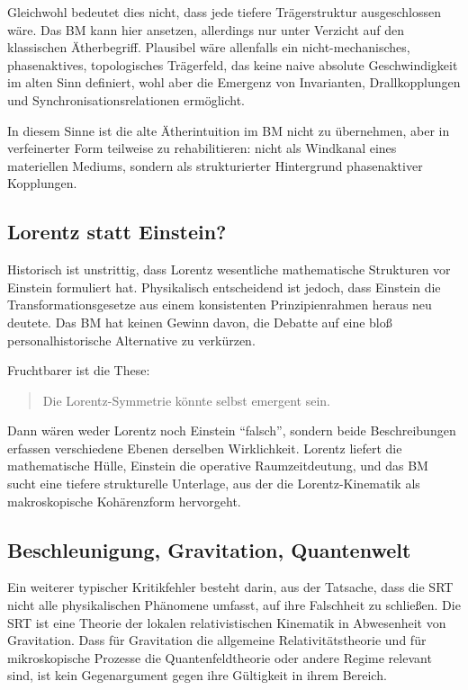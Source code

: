 \documentclass[12pt,a4paper]{article}
\begin{document}
	Gleichwohl bedeutet dies nicht, dass jede tiefere Trägerstruktur ausgeschlossen wäre. Das BM kann hier ansetzen, allerdings nur unter Verzicht auf den klassischen Ätherbegriff. Plausibel wäre allenfalls ein nicht-mechanisches, phasenaktives, topologisches Trägerfeld, das keine naive absolute Geschwindigkeit im alten Sinn definiert, wohl aber die Emergenz von Invarianten, Drallkopplungen und Synchronisationsrelationen ermöglicht.
	
	In diesem Sinne ist die alte Ätherintuition im BM nicht zu übernehmen, aber in verfeinerter Form teilweise zu rehabilitieren:
	nicht als Windkanal eines materiellen Mediums, sondern als strukturierter Hintergrund phasenaktiver Kopplungen.
	
	\subsection{Lorentz statt Einstein?}
	
	Historisch ist unstrittig, dass Lorentz wesentliche mathematische Strukturen vor Einstein formuliert hat. Physikalisch entscheidend ist jedoch, dass Einstein die Transformationsgesetze aus einem konsistenten Prinzipienrahmen heraus neu deutete. Das BM hat keinen Gewinn davon, die Debatte auf eine bloß personalhistorische Alternative zu verkürzen.
	
	Fruchtbarer ist die These:
	\begin{quote}
		Die Lorentz-Symmetrie könnte selbst emergent sein.
	\end{quote}
	Dann wären weder Lorentz noch Einstein ``falsch'', sondern beide Beschreibungen erfassen verschiedene Ebenen derselben Wirklichkeit. Lorentz liefert die mathematische Hülle, Einstein die operative Raumzeitdeutung, und das BM sucht eine tiefere strukturelle Unterlage, aus der die Lorentz-Kinematik als makroskopische Kohärenzform hervorgeht.
	
	\subsection{Beschleunigung, Gravitation, Quantenwelt}
	
	Ein weiterer typischer Kritikfehler besteht darin, aus der Tatsache, dass die SRT nicht alle physikalischen Phänomene umfasst, auf ihre Falschheit zu schließen. Die SRT ist eine Theorie der lokalen relativistischen Kinematik in Abwesenheit von Gravitation. Dass für Gravitation die allgemeine Relativitätstheorie und für mikroskopische Prozesse die Quantenfeldtheorie oder andere Regime relevant sind, ist kein Gegenargument gegen ihre Gültigkeit in ihrem Bereich.
	
\end{document}

